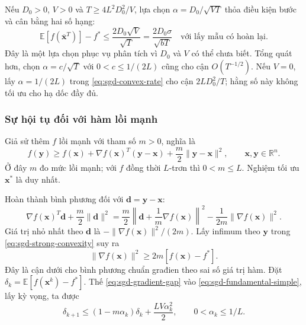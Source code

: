 Nếu $D_0>0$, $V>0$ và $T\geq4L^2D_0^2/V$, lựa chọn
$\alpha=D_0/\sqrt{VT}$ thỏa điều kiện bước và cân bằng hai số hạng:
\begin{equation}
 \mathbb{E}[f(\overline{\mathbf{x}}^{T})]-f^{*}
 \leq\frac{2D_0\sqrt{V}}{\sqrt{T}}
 =\frac{2D_0\sigma}{\sqrt{bT}}
 \quad\text{với lấy mẫu có hoàn lại}.
 \label{eq:sgd-convex-balanced}
\end{equation}
Đây là một lựa chọn phục vụ phân tích vì $D_0$ và $V$ có thể chưa biết.
Tổng quát hơn, chọn $\alpha=c/\sqrt{T}$ với $0<c\leq1/(2L)$
cũng cho cận $O(T^{-1/2})$.
Nếu $V=0$, lấy $\alpha=1/(2L)$ trong \eqref{eq:sgd-convex-rate}
cho cận $2LD_0^2/T$; hằng số này không tối ưu cho hạ dốc đầy đủ.

\subsubsection{Sự hội tụ đối với hàm lồi mạnh}

Giả sử thêm $f$ lồi mạnh với tham số $m>0$, nghĩa là
\begin{equation}
 f(\mathbf{y})\geq f(\mathbf{x})+
 \nabla f(\mathbf{x})^T(\mathbf{y}-\mathbf{x})
 +\frac{m}{2}\|\mathbf{y}-\mathbf{x}\|^2,
 \qquad \mathbf{x},\mathbf{y}\in\mathbb{R}^{n}.
 \label{eq:sgd-strong-convexity}
\end{equation}
Ở đây $m$ đo mức lồi mạnh; với $f$ đồng thời $L$-trơn thì $0<m\leq L$.
Nghiệm tối ưu $\mathbf{x}^{*}$ là duy nhất.

Hoàn thành bình phương đối với $\mathbf{d}=\mathbf{y}-\mathbf{x}$:
\[
 \nabla f(\mathbf{x})^T\mathbf{d}+\frac{m}{2}\|\mathbf{d}\|^2
 =\frac{m}{2}\left\|\mathbf{d}+\frac{1}{m}\nabla f(\mathbf{x})\right\|^2
 -\frac{1}{2m}\|\nabla f(\mathbf{x})\|^2.
\]
Giá trị nhỏ nhất theo $\mathbf{d}$ là
$-\|\nabla f(\mathbf{x})\|^2/(2m)$. Lấy infimum theo $\mathbf{y}$
trong \eqref{eq:sgd-strong-convexity} suy ra
\begin{equation}
 \|\nabla f(\mathbf{x})\|^2\geq2m[f(\mathbf{x})-f^{*}].
 \label{eq:sgd-gradient-gap}
\end{equation}
Đây là cận dưới cho bình phương chuẩn građien theo sai số giá trị hàm.
Đặt $\delta_k=\mathbb{E}[f(\mathbf{x}^{k})-f^{*}]$.
Thế \eqref{eq:sgd-gradient-gap} vào
\eqref{eq:sgd-fundamental-simple}, lấy kỳ vọng, ta được
\begin{equation}
 \delta_{k+1}\leq(1-m\alpha_k)\delta_k+
                         \frac{LV\alpha_k^2}{2},
 \qquad 0<\alpha_k\leq1/L.
 \label{eq:sgd-strong-recursion}
\end{equation}

